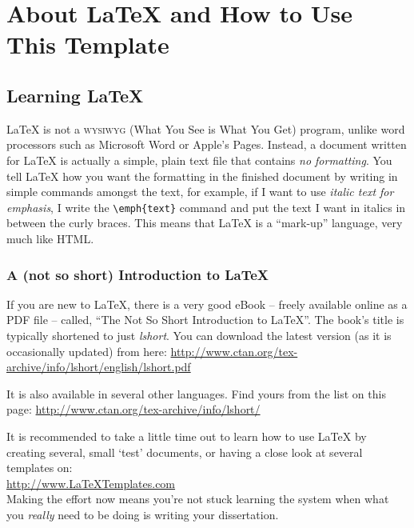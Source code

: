 
\chapter{About \LaTeX{} and How to Use This Template} %

\label{chap:Chapter2} %


\section{Learning \LaTeX{}}

\LaTeX{} is not a \textsc{wysiwyg} (What You See is What You Get) program, unlike word processors such as Microsoft Word or Apple's Pages. Instead, a document written for \LaTeX{} is actually a simple, plain text file that contains \emph{no formatting}. You tell \LaTeX{} how you want the formatting in the finished document by writing in simple commands amongst the text, for example, if I want to use \emph{italic text for emphasis}, I write the \verb|\emph{text}| command and put the text I want in italics in between the curly braces. This means that \LaTeX{} is a \enquote{mark-up} language, very much like HTML.

\subsection{A (not so short) Introduction to \LaTeX{}}

If you are new to \LaTeX{}, there is a very good eBook -- freely available online as a PDF file -- called, \enquote{The Not So Short Introduction to \LaTeX{}}. The book's title is typically shortened to just \emph{lshort}. You can download the latest version (as it is occasionally updated) from here:
\url{http://www.ctan.org/tex-archive/info/lshort/english/lshort.pdf}

It is also available in several other languages. Find yours from the list on this page: \url{http://www.ctan.org/tex-archive/info/lshort/}

It is recommended to take a little time out to learn how to use \LaTeX{} by creating several, small `test' documents, or having a close look at several templates on:\\ 
\url{http://www.LaTeXTemplates.com}\\ 
Making the effort now means you're not stuck learning the system when what you \emph{really} need to be doing is writing your dissertation.

